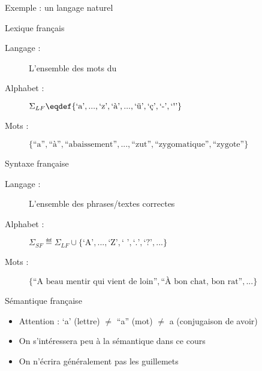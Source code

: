 
\begingroup
\begin{frame}{Exemple : un langage naturel}
  \begin{block}{Lexique français}
    \begin{description}
    \item[Langage :] L'ensemble des mots du 
    \item[Alphabet :] $\Sigma_{LF} \eqdef \{\text{`a'}, ...,  \text{`z'}, \text{`à'}, ..., \text{`ü'}, \text{`ç'}, \text{`-'}, \text{`\textquotesingle'}\}$
    \item[Mots :] $\{\text{``a''}, \text{``à''}, \text{``abaissement''}, ..., \text{``zut''}, \text{``zygomatique''}, \text{``zygote''}\}$
    \end{description}
  \end{block}
  
  \pause
  \begin{block}{Syntaxe française}
    \begin{description}
    \item[Langage :] L'ensemble des phrases/textes  correctes
    \item[Alphabet :] $\Sigma_{SF} \eqdef \Sigma_{LF} \cup \{\text{`A'}, ..., \text{`Z'}, \text{`~'}, \text{`.'}, \text{`?'}, ...\}$
    \item[Mots :] $\{\text{``A beau mentir qui vient de loin''}, \text{``À bon chat, bon rat''}, ...\}$
    \end{description}
  \end{block}
  
  \pause
  \begin{alertblock}{Sémantique française}
    \begin{itemize}
    \item \alert{Attention :} `a' (lettre) $\neq$ ``a'' (mot) $\neq$ a (conjugaison de avoir)
    \item On s'intéressera peu à la sémantique dans ce cours
    \item On n'écrira généralement pas les guillemets
    \end{itemize}
  \end{alertblock}
\end{frame}

\endgroup
